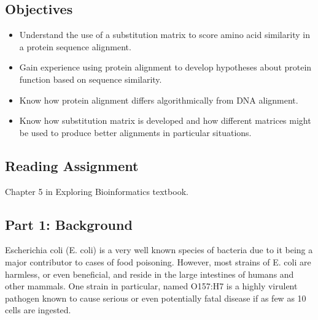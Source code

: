 

\long{}



\vspace*{-.1in}
\subsection*{Objectives}
\vspace*{-.1in}

\begin{itemize}
	\item Understand the use of a substitution matrix to score amino acid similarity in a protein sequence alignment.
	\item Gain experience using protein alignment to develop hypotheses about protein function based on sequence similarity.  
	\item Know how protein alignment differs algorithmically from DNA alignment.
	\item Know how substitution matrix is developed and how different matrices might be used to produce better alignments in particular situations.

\end{itemize}

\vspace*{-.1in}
\subsection*{Reading Assignment}
\vspace*{-.1in}
Chapter 5 in Exploring Bioinformatics textbook.



\vspace*{-.1in}
\subsection*{Part 1: Background}
\vspace*{-.1in} 

Escherichia coli (E. coli) is a very well known species of bacteria due to it being a major contributor to cases of food poisoning.  However, most strains of E. coli are harmless, or even beneficial, and reside in the large intestines of humans and other mammals.  One strain in particular, named O157:H7 is a highly virulent pathogen known to cause serious or even potentially fatal disease if as few as 10 cells are ingested.  


